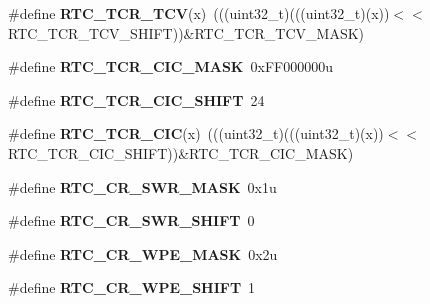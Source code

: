 \begin{DoxyCompactItemize}
\item 
\#define {\bfseries R\+T\+C\+\_\+\+T\+C\+R\+\_\+\+T\+CV}(x)~(((uint32\+\_\+t)(((uint32\+\_\+t)(x))$<$$<$R\+T\+C\+\_\+\+T\+C\+R\+\_\+\+T\+C\+V\+\_\+\+S\+H\+I\+FT))\&R\+T\+C\+\_\+\+T\+C\+R\+\_\+\+T\+C\+V\+\_\+\+M\+A\+SK)\hypertarget{group__RTC__Register__Masks_gaa8994c74539b06641e723be00af76459}{}\label{group__RTC__Register__Masks_gaa8994c74539b06641e723be00af76459}

\item 
\#define {\bfseries R\+T\+C\+\_\+\+T\+C\+R\+\_\+\+C\+I\+C\+\_\+\+M\+A\+SK}~0x\+F\+F000000u\hypertarget{group__RTC__Register__Masks_ga788e49f72c48b3c98794b49e27337c64}{}\label{group__RTC__Register__Masks_ga788e49f72c48b3c98794b49e27337c64}

\item 
\#define {\bfseries R\+T\+C\+\_\+\+T\+C\+R\+\_\+\+C\+I\+C\+\_\+\+S\+H\+I\+FT}~24\hypertarget{group__RTC__Register__Masks_ga84c801695fa1e344e7b2c8e6568cb7c8}{}\label{group__RTC__Register__Masks_ga84c801695fa1e344e7b2c8e6568cb7c8}

\item 
\#define {\bfseries R\+T\+C\+\_\+\+T\+C\+R\+\_\+\+C\+IC}(x)~(((uint32\+\_\+t)(((uint32\+\_\+t)(x))$<$$<$R\+T\+C\+\_\+\+T\+C\+R\+\_\+\+C\+I\+C\+\_\+\+S\+H\+I\+FT))\&R\+T\+C\+\_\+\+T\+C\+R\+\_\+\+C\+I\+C\+\_\+\+M\+A\+SK)\hypertarget{group__RTC__Register__Masks_ga650d1b34ad6d46090befda0296b4fe3f}{}\label{group__RTC__Register__Masks_ga650d1b34ad6d46090befda0296b4fe3f}

\item 
\#define {\bfseries R\+T\+C\+\_\+\+C\+R\+\_\+\+S\+W\+R\+\_\+\+M\+A\+SK}~0x1u\hypertarget{group__RTC__Register__Masks_ga114a670a6ac2782bd777ea33e4395059}{}\label{group__RTC__Register__Masks_ga114a670a6ac2782bd777ea33e4395059}

\item 
\#define {\bfseries R\+T\+C\+\_\+\+C\+R\+\_\+\+S\+W\+R\+\_\+\+S\+H\+I\+FT}~0\hypertarget{group__RTC__Register__Masks_gac0a88898cc6e1686b54a99e3a6fe759d}{}\label{group__RTC__Register__Masks_gac0a88898cc6e1686b54a99e3a6fe759d}

\item 
\#define {\bfseries R\+T\+C\+\_\+\+C\+R\+\_\+\+W\+P\+E\+\_\+\+M\+A\+SK}~0x2u\hypertarget{group__RTC__Register__Masks_gade2b0c86902f83d7674c10e3a7923f80}{}\label{group__RTC__Register__Masks_gade2b0c86902f83d7674c10e3a7923f80}

\item 
\#define {\bfseries R\+T\+C\+\_\+\+C\+R\+\_\+\+W\+P\+E\+\_\+\+S\+H\+I\+FT}~1\hypertarget{group__RTC__Register__Masks_ga319f4682f30aed777eecac4c09a96223}{}\label{group__RTC__Register__Masks_ga319f4682f30aed777eecac4c09a96223}


\end{DoxyCompactItemize}

